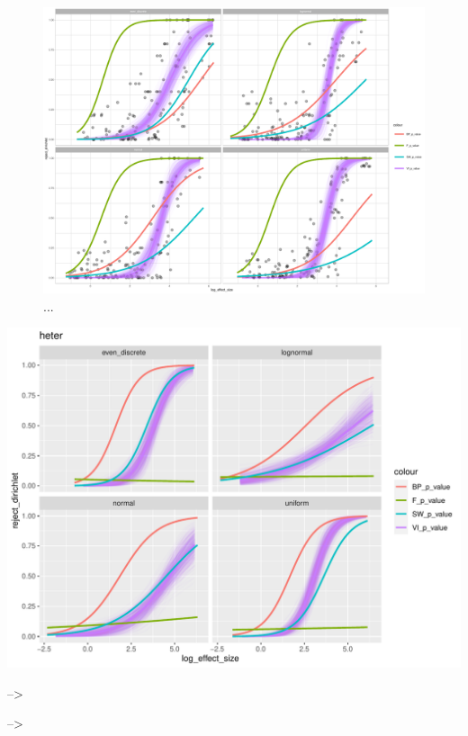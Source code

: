 \documentclass[]{interact}
\theoremstyle{plain}%
\theoremstyle{definition}
\theoremstyle{remark}
\begin{document}
\begin{figure}

{\centering \includegraphics[width=1\linewidth]{paper_comparison_files/figure-latex/dist-power-1} 

}

\caption{...}\label{fig:dist-power}
\end{figure}

\begin{center}\includegraphics[width=1\linewidth]{paper_comparison_files/figure-latex/unnamed-chunk-6-1} \end{center}

--\textgreater{}

--\textgreater{}



\end{document}
